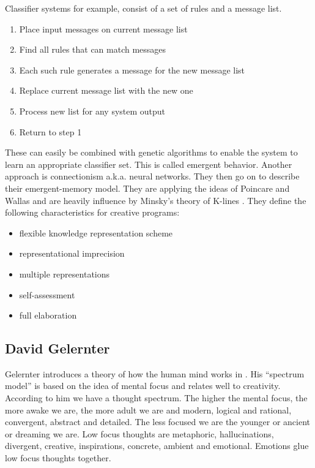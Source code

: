 Classifier systems for example, consist of a set of rules and a message list.

\begin{enumerate}
  \item Place input messages on current message list
  \item Find all rules that can match messages
  \item Each such rule generates a message for the new message list
  \item Replace current message list with the new one
  \item Process new list for any system output
  \item Return to step 1
\end{enumerate}

These can easily be combined with genetic algorithms to enable the system to learn an appropriate classifier set. This is called emergent behavior. Another approach is connectionism a.k.a. neural networks. They then go on to describe their emergent-memory model. They are applying the ideas of Poincare and Wallas and are heavily influence by Minsky's theory of K-lines \citep{Minsky1980, Minsky1988}. They define the following characteristics for creative programs:

\begin{itemize}
  \item flexible knowledge representation scheme
  \item representational imprecision
  \item multiple representations
  \item self-assessment
  \item full elaboration
\end{itemize}

\subsection{David Gelernter}

Gelernter introduces a theory of how the human mind works in \citep{Gelernter1994}. His ``spectrum model'' is based on the idea of mental focus and relates well to creativity. According to him we have a thought spectrum. The higher the mental focus, the more awake we are, the more adult we are and modern, logical and rational, convergent, abstract and detailed. The less focused we are the younger or ancient or dreaming we are. Low focus thoughts are metaphoric, hallucinations, divergent, creative, inspirations, concrete, ambient and emotional. Emotions glue low focus thoughts together.

